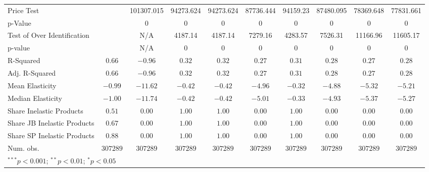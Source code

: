 \documentclass{article}
\begin{document}
\begin{appendices}
\begin{table}
{\begin{tabular}{l c c c c c c c c c}
Price Test                  &               & 101307.015    & 94273.624     & 94273.624     & 87736.444     & 94159.23      & 87480.095     & 78369.648     & 77831.661     \\
p-Value                     &               & 0             & 0             & 0             & 0             & 0             & 0             & 0             & 0             \\
Test of Over Identification &               & N/A           & 4187.14       & 4187.14       & 7279.16       & 4283.57       & 7526.31       & 11166.96      & 11605.17      \\
p-value                     &               & N/A           & 0             & 0             & 0             & 0             & 0             & 0             & 0             \\
R-Squared                   & $0.66$        & $-0.96$       & $0.32$        & $0.32$        & $0.27$        & $0.31$        & $0.28$        & $0.27$        & $0.28$        \\
Adj. R-Squared              & $0.66$        & $-0.96$       & $0.32$        & $0.32$        & $0.27$        & $0.31$        & $0.28$        & $0.27$        & $0.28$        \\
Mean Elasticity             & $-0.99$       & $-11.62$      & $-0.42$       & $-0.42$       & $-4.96$       & $-0.32$       & $-4.88$       & $-5.32$       & $-5.21$       \\
Median Elasticity           & $-1.00$       & $-11.74$      & $-0.42$       & $-0.42$       & $-5.01$       & $-0.33$       & $-4.93$       & $-5.37$       & $-5.27$       \\
Share Inelastic Products    & $0.51$        & $0.00$        & $1.00$        & $1.00$        & $0.00$        & $1.00$        & $0.00$        & $0.00$        & $0.00$        \\
Share JB Inelastic Products & $0.67$        & $0.00$        & $1.00$        & $1.00$        & $0.00$        & $1.00$        & $0.00$        & $0.00$        & $0.00$        \\
Share SP Inelastic Products & $0.88$        & $0.00$        & $1.00$        & $1.00$        & $0.00$        & $1.00$        & $0.00$        & $0.00$        & $0.00$        \\
Num. obs.                   & $307289$      & $307289$      & $307289$      & $307289$      & $307289$      & $307289$      & $307289$      & $307289$      & $307289$      \\
\bottomrule
\multicolumn{10}{l}{\scriptsize{$^{***}p<0.001$; $^{**}p<0.01$; $^{*}p<0.05$}}
\end{tabular}
        }
    \end{table}


\end{appendices}
\end{document}
